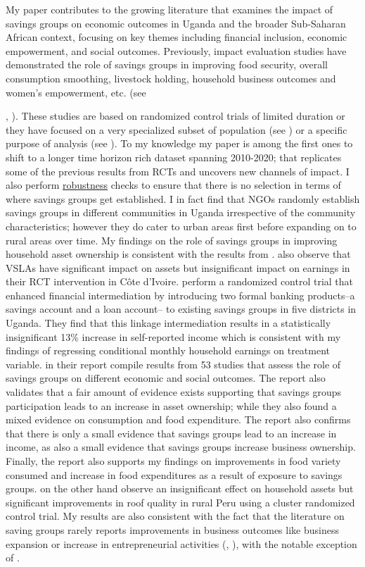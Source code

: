 \documentclass[12pt]{article}
\begin{document}
\hspace{1cm} My paper contributes to the growing literature that examines the impact of savings groups on economic outcomes in Uganda and the broader Sub-Saharan African context, focusing on key themes including financial inclusion, economic empowerment, and social outcomes. Previously, impact evaluation studies have demonstrated the role of savings groups in improving food security, overall consumption smoothing, livestock holding, household business outcomes and women’s empowerment, etc. (see {\cite{beaman}, \cite{gash}). These studies are based on randomized control trials of limited duration or they have focused on a very specialized subset of population (see \cite{amponsah}) or a specific purpose of analysis (see \cite{dupas}). To my knowledge my paper is among the first ones to shift to a longer time horizon rich dataset spanning 2010-2020; that replicates some of the previous results from RCTs and uncovers new channels of impact. I also perform \hyperref[sec:robustness]{robustness} checks to ensure that there is no selection in terms of where savings groups get established. I in fact find that NGOs randomly establish savings groups in different communities in Uganda irrespective of the community characteristics; however they do cater to urban areas first before expanding on to rural areas over time. My findings on the role of savings groups in improving household asset ownership is consistent with the results from \cite{bundervoet}. \cite{marguerie} also observe that VSLAs have significant impact on assets but insignificant impact on earnings in their RCT intervention in Côte d’Ivoire. \cite{goldberg} perform a randomized control trial that enhanced financial intermediation by introducing two formal banking products–a savings account and a loan account– to existing savings groups in five districts in Uganda. They find that this linkage intermediation results in a statistically insignificant 13\% increase in self-reported income which is consistent with my findings of regressing conditional monthly household earnings on treatment variable. \cite{seep} in their report compile results from 53 studies that assess the role of savings groups on different economic and social outcomes. The report also validates that a fair amount of evidence exists supporting that savings groups participation leads to an increase in asset ownership; while they also found a mixed evidence on consumption and food expenditure. The report also confirms that there is only a small evidence that savings groups lead to an increase in income, as also a small evidence that savings groups increase business ownership. Finally, the report also supports my findings on improvements in food variety consumed and increase in food expenditures as a result of exposure to savings groups. \cite{frisancho} on the other hand observe an insignificant effect on household assets but significant improvements in roof quality in rural Peru using a cluster randomized control trial. My results are also consistent with the fact that the literature on saving groups rarely reports improvements in business outcomes like business expansion or increase in entrepreneurial activities (\cite{beaman}, \cite{ksoll}), with the notable exception of \cite{karlan}.


}
\end{document}
